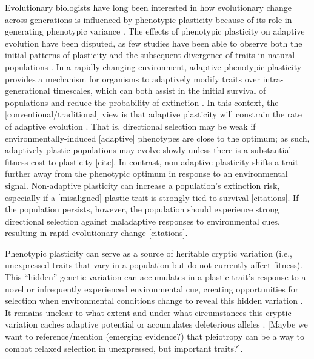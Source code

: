 Evolutionary biologists have long been interested in how evolutionary change across generations is influenced by phenotypic plasticity because of its role in generating phenotypic variance \citep{gibert_phenotypic_2019}.
The effects of phenotypic plasticity on adaptive evolution have been disputed, as few studies have been able to observe both the initial patterns of plasticity and the subsequent divergence of traits in natural populations \citep{ghalambor_adaptive_2007,wund_assessing_2012,forsman_rethinking_2015,ghalambor_non-adaptive_2015,hendry_key_2016}.
In a rapidly changing environment, adaptive phenotypic plasticity provides a mechanism for organisms to adaptively modify traits over intra-generational timescales, which can both assist in the initial survival of populations and reduce the probability of extinction \citep{gibert_phenotypic_2019}.
In this context, the [conventional/traditional] view is that adaptive plasticity will constrain the rate of adaptive evolution \citep{gupta_study_1982,ancel_undermining_2000,huey_behavioral_2003,price_role_2003,paenke_influence_2007}.
That is, directional selection may be weak if environmentally-induced [adaptive] phenotypes are close to the optimum; as such, adaptively plastic populations may evolve slowly unless there is a substantial fitness cost to plasticity [cite].
In contrast, non-adaptive plasticity shifts a trait further away from the phenotypic optimum in response to an environmental signal.
Non-adaptive plasticity can increase a population's extinction risk, especially if a [misaligned] plastic trait is strongly tied to survival [citations].
If the population persists, however, the population should experience strong directional selection against maladaptive responses to environmental cues, resulting in rapid evolutionary change [citations].

Phenotypic plasticity can serve as a source of heritable cryptic variation (i.e., unexpressed traits that vary in a population but do not currently affect fitness).
This ``hidden'' genetic variation can accumulates in a plastic trait's response to a novel or infrequently experienced environmental cue, creating opportunities for selection when environmental conditions change to reveal this hidden variation \citep{schlichting_hidden_2008,levis_evaluating_2016}.
It remains unclear to what extent and under what circumstances this cryptic variation caches adaptive potential or accumulates deleterious alleles \citep{gibson_uncovering_2004,paaby_cryptic_2014,zheng_cryptic_2019}.
[Maybe we want to reference/mention (emerging evidence?) that pleiotropy can be a way to combat relaxed selection in unexpressed, but important traits?].

